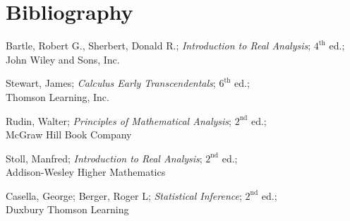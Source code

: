 \section{Bibliography}

\begin{thebibliography}{9}
Bartle, Robert G., Sherbert, Donald R.; \textit{Introduction to Real Analysis}; $4^{\text{th}}$ ed.;\\ John Wiley and Sons, Inc.

Stewart, James; \textit{Calculus Early Transcendentals}; $6^{\text{th}}$ ed.;\\ Thomson Learning, Inc.

Rudin, Walter; \textit{Principles of Mathematical Analysis}; $2^{\text{nd}}$ ed.;\\ McGraw Hill Book Company

Stoll, Manfred; \textit{Introduction to Real Analysis}; $2^{\text{nd}}$ ed.;\\ Addison-Wesley Higher Mathematics

Casella, George; Berger, Roger L; \textit{Statistical Inference}; $2^{\text{nd}}$ ed.;\\ Duxbury Thomson Learning

\end{thebibliography}